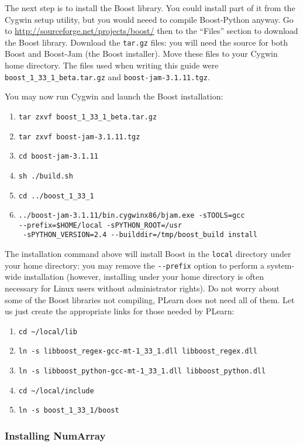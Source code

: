 \documentclass[11pt]{book}
\begin{document}
The next step is to install the Boost library.
You could install part of it from the Cygwin setup utility, but you would
neeed to compile Boost-Python anyway.
Go to \url{http://sourceforge.net/projects/boost/} then to the ``Files'' section
to download
the Boost library. Download the \verb!tar.gz! files:
you will need the source for both Boost and Boost-Jam (the Boost installer).
Move these files to your Cygwin home directory.
The files used when writing this guide were \verb!boost_1_33_1_beta.tar.gz!
and \verb!boost-jam-3.1.11.tgz!.

You may now run Cygwin and launch the Boost installation:
\begin{enumerate}
\item \verb!tar zxvf boost_1_33_1_beta.tar.gz!
\item \verb!tar zxvf boost-jam-3.1.11.tgz!
\item \verb!cd boost-jam-3.1.11!
\item \verb!sh ./build.sh!
\item \verb!cd ../boost_1_33_1!
\item \verb!../boost-jam-3.1.11/bin.cygwinx86/bjam.exe -sTOOLS=gcc! \\
\verb!--prefix=$HOME/local -sPYTHON_ROOT=/usr! \\
\verb! -sPYTHON_VERSION=2.4 --builddir=/tmp/boost_build install!
\end{enumerate}

The installation command above will install Boost in the \verb!local! directory
under your home directory: you may remove the \verb!--prefix! option to perform
a system-wide installation (however, installing under your home directory is often
necessary for Linux users without administrator rights).
Do not worry about some of the Boost libraries not compiling, PLearn does not
need all of them.
Let us just create the appropriate links for those needed by PLearn:
\begin{enumerate}
\item \verb!cd ~/local/lib!
\item \verb!ln -s libboost_regex-gcc-mt-1_33_1.dll libboost_regex.dll!
\item \verb!ln -s libboost_python-gcc-mt-1_33_1.dll libboost_python.dll!
\item \verb!cd ~/local/include!
\item \verb!ln -s boost_1_33_1/boost!
\end{enumerate}

\subsubsection{Installing NumArray}
\end{document}
